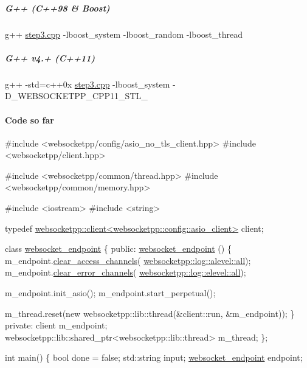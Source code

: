 \subparagraph*{G++ (C++98 \& Boost)}

{\ttfamily g++ \hyperlink{step3_8cpp_source}{step3.\+cpp} -\/lboost\+\_\+system -\/lboost\+\_\+random -\/lboost\+\_\+thread}

\subparagraph*{G++ v4.+ (C++11)}

{\ttfamily g++ -\/std=c++0x \hyperlink{step3_8cpp_source}{step3.\+cpp} -\/lboost\+\_\+system -\/\+D\+\_\+\+W\+E\+B\+S\+O\+C\+K\+E\+T\+P\+P\+\_\+\+C\+P\+P11\+\_\+\+S\+T\+L\+\_\+}

\paragraph*{Code so far}


\begin{DoxyCode}
\textcolor{preprocessor}{#include <websocketpp/config/asio\_no\_tls\_client.hpp>}
\textcolor{preprocessor}{#include <websocketpp/client.hpp>}

\textcolor{preprocessor}{#include <websocketpp/common/thread.hpp>}
\textcolor{preprocessor}{#include <websocketpp/common/memory.hpp>}

\textcolor{preprocessor}{#include <iostream>}
\textcolor{preprocessor}{#include <string>}

\textcolor{keyword}{typedef} \hyperlink{classwebsocketpp_1_1client}{websocketpp::client<websocketpp::config::asio\_client>}
       client;

\textcolor{keyword}{class }\hyperlink{classwebsocket__endpoint}{websocket\_endpoint} \{
\textcolor{keyword}{public}:
    \hyperlink{classwebsocket__endpoint}{websocket\_endpoint} () \{
        m\_endpoint.\hyperlink{classwebsocketpp_1_1endpoint_a3fe357b3c6434273a9965eb52902575d}{clear\_access\_channels}(
      \hyperlink{structwebsocketpp_1_1log_1_1alevel_a853aa0b8976e53f3181af3bc398d493e}{websocketpp::log::alevel::all});
        m\_endpoint.\hyperlink{classwebsocketpp_1_1endpoint_a8cefa4fc37c0df4eb6ed0bcf04bb0da5}{clear\_error\_channels}(
      \hyperlink{structwebsocketpp_1_1log_1_1elevel_a9b31ff708c221d314f9f4eb3ff2b1ad7}{websocketpp::log::elevel::all});

        m\_endpoint.init\_asio();
        m\_endpoint.start\_perpetual();

        m\_thread.reset(\textcolor{keyword}{new} websocketpp::lib::thread(&client::run, &m\_endpoint));
    \}
\textcolor{keyword}{private}:
    client m\_endpoint;
    websocketpp::lib::shared\_ptr<websocketpp::lib::thread> m\_thread;
\};

\textcolor{keywordtype}{int} main() \{
    \textcolor{keywordtype}{bool} done = \textcolor{keyword}{false};
    std::string input;
    \hyperlink{classwebsocket__endpoint}{websocket\_endpoint} endpoint;


\end{DoxyCode}
